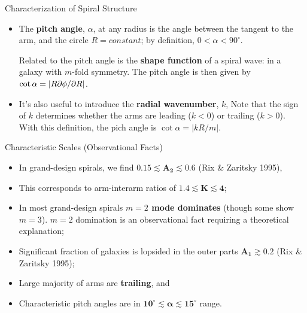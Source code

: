 \documentclass[letterpaper,landscape]{slides}
\begin{document}
\begin{slide}
\begin{center}
{\large \color{red} 
                 Characterization of Spiral Structure  }
\end{center}
\begin{itemize}

\item The {\bf pitch angle}, $\alpha$, at any radius is the angle between the tangent to the arm,
and the circle $R = constant$; by definition, $0 < \alpha < 90^\circ$.

Related to the pitch angle is the {\bf shape function} of a spiral wave:
in a galaxy with $m$-fold symmetry. The pitch angle is then given by {\color{blue} $\cot \alpha = |R \partial \phi / \partial R|$}.

\item It's also useful to introduce the {\bf radial wavenumber}, $k$,
Note that the sign of $k$ determines whether the arms are leading ($k < 0$) or
trailing ($k > 0$). With this definition, the pich angle is {\color{blue} $\cot \alpha = |k R / m|$}.

\end{itemize}
\vfill
\end{slide}


\begin{slide}
\begin{center}
{\large \color{red} 
                 Characteristic Scales (Observational Facts) }
\end{center}
\begin{itemize}

\item In grand-design spirals, we find $\bm{0.15 \lesssim A_2 \lesssim 0.6}$ (Rix \& Zaritsky 1995),
\item This corresponds to arm-interarm ratios of $\bm{1.4 \lesssim K \lesssim 4}$;
\item In most grand-design spirals {\bf $m=2$ mode dominates} (though some show $m=3$). $m=2$ domination
is an observational fact requiring a theoretical explanation;
\item Significant fraction of galaxies is lopsided in the outer parts $\bm{A_1 \gtrsim 0.2}$ (Rix \& Zaritsky 1995);
\item Large majority of arms are {\bf trailing}, and
\item Characteristic pitch angles are in $\bm{10^\circ \lesssim \alpha \lesssim 15^\circ}$ range.

\end{itemize}
\vfill
\end{slide}
\end{document}
